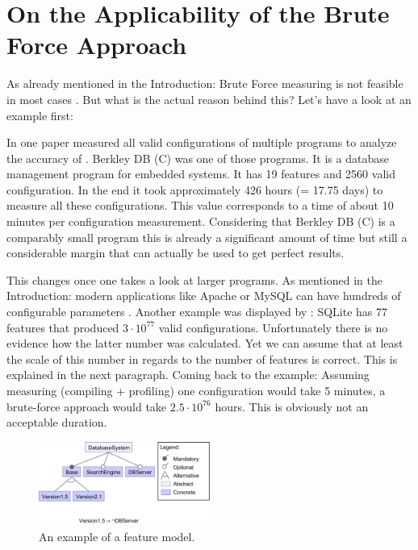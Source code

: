 \section{On the Applicability of the Brute Force Approach}
\label{sec:BruteForce}
As already mentioned in the Introduction: Brute Force measuring is not feasible in most cases \cite{AutomatedFeatureDetectionSiegmund2012}. But what is the actual reason behind this?
Let's have a look at an example first:

In one paper \citet{AutomatedFeatureDetectionSiegmund2012} measured all valid configurations of multiple programs to analyze the accuracy of \AFID. Berkley DB (C) was one of those programs. It is a database management program for embedded systems. It has 19 features and 2560 valid configuration. In the end it took approximately 426 hours (= 17.75 days) to measure all these configurations. This value corresponds to a time of about 10 minutes per configuration measurement. Considering that Berkley DB (C) is a comparably small program this is already a significant amount of time but still a considerable margin that can actually be used to get perfect results.

This changes once one takes a look at larger programs. As mentioned in the Introduction: modern applications like Apache or MySQL can have hundreds of configurable parameters \cite{YouveGivenMeTooManyKnobs}. Another example was displayed by \citet{VAMOSConference}: SQLite has 77 features that produced $3 \cdot 10^{77}$ valid configurations. Unfortunately there is no evidence how the latter number was calculated. Yet we can assume that at least the scale of this number in regards to the number of features is correct. This is explained in the next paragraph. Coming back to the example: Assuming measuring (compiling + profiling) one configuration would take 5 minutes, a brute-force approach would take $2.5 \cdot 10^76$ hours. This is obviously not an acceptable duration.

\begin{figure}
	\includegraphics[width = 0.5\textwidth]{presentation/figures/FeatureModel}
	\captionsetup{width=0.95\linewidth}
	\caption{An example of a feature model.}
	\label{fig:FeatureModel}
\end{figure}

